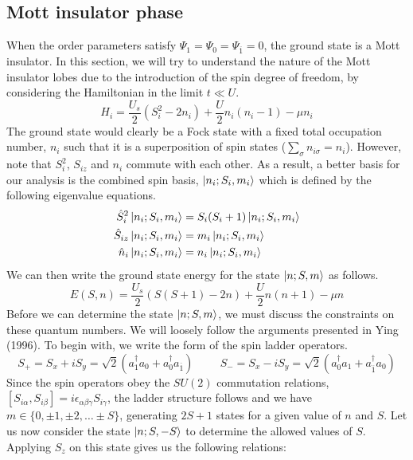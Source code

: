\subsection{Mott insulator phase}\label{sec:mi_constraint}
When the order parameters satisfy $\Psi_1 = \Psi_0 = \Psi_{\overline{1}} = 0$, the ground state is a Mott insulator. In this section, we will try to understand the nature of the Mott insulator lobes due to the introduction of the spin degree of freedom, by considering the Hamiltonian in the limit $t \ll U$. 
\begin{equation}
    H_i = \frac{U_s}{2}(S_i^2 - 2n_i) + \frac{U}{2}n_i(n_i - 1) - \mu n_i
\end{equation}
The ground state would clearly be a Fock state with a fixed total occupation number, $n_i$ such that it is a superposition of spin states ($\sum_{\sigma}n_{i\sigma} = n_i$). However, note that $S_i^2$, $S_{iz}$ and $n_i$ commute with each other. As a result, a better basis for our analysis is the combined spin basis, $\ket{n_i; S_i, m_i}$ which is defined by the following eigenvalue equations.
\begin{align}
    \hat{S}_i^2 \ket{n_i; S_i, m_i} &= S_i(S_i + 1)\ket{n_i; S_i, m_i} \\  
    \hat{S}_{iz}\ket{n_i; S_i, m_i} &= m_i \ket{n_i; S_i, m_i} \\ 
    \hat{n}_i \ket{n_i; S_i, m_i} &= n_i \ket{n_i; S_i, m_i}
\end{align}
We can then write the ground state energy for the state $\ket{n; S, m}$ as follows.
\begin{equation}
    E(S, n) = \frac{U_s}{2}(S(S+1) - 2n) + \frac{U}{2}n(n+1) - \mu n
\end{equation}
Before we can determine the state $\ket{n;S, m}$, we must discuss the constraints on these quantum numbers. We will loosely follow the arguments presented in Ying (1996)\cite{ying96}. To begin with, we write the form of the spin ladder operators.
\begin{equation}
    S_+ = S_x + iS_y = \sqrt{2}(a_{1}^{\dagger}a_{0} + a_{0}^{\dagger}a_{\overline{1}}) \hspace{1cm} S_- = S_x - iS_y = \sqrt{2}(a_{0}^{\dagger}a_{1} + a_{\overline{1}}^{\dagger}a_{0})
\end{equation}
Since the spin operators obey the $SU(2)$ commutation relations, $[S_{i\alpha}, S_{i\beta}] = i \epsilon_{\alpha\beta\gamma}S_{i\gamma}$, the ladder structure follows and we have $m \in \{0, \pm 1, \pm 2, \dots \pm S\}$, generating $2S+1$ states for a given value of $n$ and $S$. Let us now consider the state $\ket{n;S, -S}$ to determine the allowed values of $S$. Applying $S_z$ on this state gives us the following relations:
